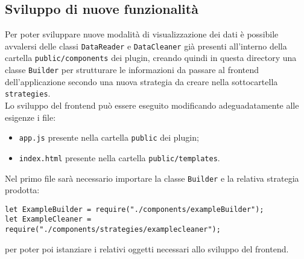 \subsection{Sviluppo di nuove funzionalità}
\label{sec:nuovefunzionalita}
Per poter sviluppare nuove modalità di visualizzazione dei dati è possibile avvalersi delle classi \texttt{DataReader} e \texttt{DataCleaner} già presenti all'interno della cartella \texttt{public/components} dei plugin, creando quindi in questa directory una classe \texttt{Builder} per strutturare le informazioni da passare al frontend dell'applicazione secondo una nuova strategia da creare nella sottocartella \texttt{strategies}.\\
Lo sviluppo del frontend può essere eseguito modificando adeguadatamente alle esigenze i file:
\begin{itemize}
	\item \texttt{app.js} presente nella cartella \texttt{public} dei plugin;
	\item \texttt{index.html} presente nella cartella \texttt{public/templates}.
\end{itemize}
Nel primo file sarà necessario importare la classe \texttt{Builder} e la relativa strategia prodotta:
\begin{lstlisting}
let ExampleBuilder = require("./components/exampleBuilder");
let ExampleCleaner = require("./components/strategies/examplecleaner");
\end{lstlisting}
per poter poi istanziare i relativi oggetti necessari allo sviluppo del frontend.






